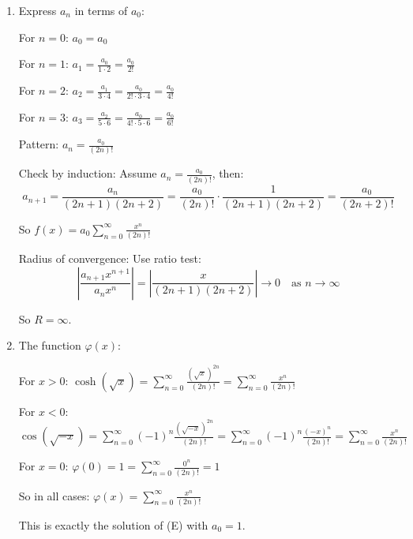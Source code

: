 \documentclass[12pt]{article}
\begin{document}
\begin{answerbox}
\begin{enumerate}
    So the recurrence holds for all $n \geq 0$.
    
    \item Express $a_n$ in terms of $a_0$:
    
    For $n=0$: $a_0 = a_0$
    
    For $n=1$: $a_1 = \frac{a_0}{1\cdot 2} = \frac{a_0}{2!}$
    
    For $n=2$: $a_2 = \frac{a_1}{3\cdot 4} = \frac{a_0}{2! \cdot 3\cdot 4} = \frac{a_0}{4!}$
    
    For $n=3$: $a_3 = \frac{a_2}{5\cdot 6} = \frac{a_0}{4! \cdot 5\cdot 6} = \frac{a_0}{6!}$
    
    Pattern: $a_n = \frac{a_0}{(2n)!}$
    
    Check by induction: Assume $a_n = \frac{a_0}{(2n)!}$, then:
    \[
    a_{n+1} = \frac{a_n}{(2n+1)(2n+2)} = \frac{a_0}{(2n)!} \cdot \frac{1}{(2n+1)(2n+2)} = \frac{a_0}{(2n+2)!}
    \]
    
    So $f(x) = a_0 \sum_{n=0}^\infty \frac{x^n}{(2n)!}$
    
    Radius of convergence: Use ratio test:
    \[
    \left|\frac{a_{n+1} x^{n+1}}{a_n x^n}\right| = \left|\frac{x}{(2n+1)(2n+2)}\right| \to 0 \quad \text{as } n \to \infty
    \]
    
    So $R = \infty$.
    
    \item The function $\varphi(x)$:
    
    For $x > 0$: $\cosh(\sqrt{x}) = \sum_{n=0}^\infty \frac{(\sqrt{x})^{2n}}{(2n)!} = \sum_{n=0}^\infty \frac{x^n}{(2n)!}$
    
    For $x < 0$: $\cos(\sqrt{-x}) = \sum_{n=0}^\infty (-1)^n \frac{(\sqrt{-x})^{2n}}{(2n)!} = \sum_{n=0}^\infty (-1)^n \frac{(-x)^n}{(2n)!} = \sum_{n=0}^\infty \frac{x^n}{(2n)!}$
    
    For $x=0$: $\varphi(0)=1 = \sum_{n=0}^\infty \frac{0^n}{(2n)!} = 1$
    
    So in all cases: $\varphi(x) = \sum_{n=0}^\infty \frac{x^n}{(2n)!}$
    
    This is exactly the solution of (E) with $a_0=1$.
\end{enumerate}
\end{answerbox}

\end{document}
